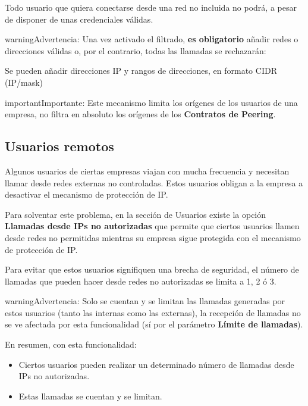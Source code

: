 \documentclass[letterpaper,10pt,spanish]{sphinxmanual}
\begin{document}
Todo usuario que quiera conectarse desde una red no incluida no podrá, a pesar de disponer de unas credenciales válidas.

\begin{notice}{warning}{Advertencia:}
Una vez activado el filtrado, \textbf{es obligatorio} añadir redes o direcciones válidas o, por el contrario, todas las llamadas se rechazarán:
\end{notice}

\noindent{}

Se pueden añadir direcciones IP y rangos de direcciones, en formato CIDR (IP/mask)

\noindent{}

\begin{notice}{important}{Importante:}
Este mecanismo limita los orígenes de los usuarios de una empresa, no filtra en absoluto los orígenes de los \textbf{Contratos de Peering}.
\end{notice}


\subsection{Usuarios remotos}
\label{security/index:roadwarrior-users}\label{security/index:id1}
Algunos usuarios de ciertas empresas viajan con mucha frecuencia y necesitan llamar desde redes externas no controladas. Estos usuarios obligan a la empresa a desactivar el mecanismo de protección de IP.

Para solventar este problema, en la sección de Usuarios existe la opción \textbf{Llamadas desde IPs no autorizadas} que permite que ciertos usuarios llamen desde redes no permitidas mientras su empresa sigue protegida con el mecanismo de protección de IP.

Para evitar que estos usuarios signifiquen una brecha de seguridad, el número de llamadas que pueden hacer desde redes no autorizadas se limita a 1, 2 ó 3.

\begin{notice}{warning}{Advertencia:}
Solo se cuentan y se limitan las llamadas generadas por estos usuarios (tanto las internas como las externas), la recepción de llamadas no se ve afectada por esta funcionalidad (sí por el parámetro \textbf{Límite de llamadas}).
\end{notice}

En resumen, con esta funcionalidad:
\begin{itemize}
\item {} 
Ciertos usuarios pueden realizar un determinado número de llamadas desde IPs no autorizadas.

\item {} 
Estas llamadas se cuentan y se limitan.

\end{itemize}
\end{document}
